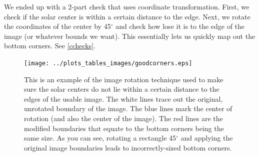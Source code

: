 \documentclass[10pt]{scrartcl}
\begin{document}
We ended up with a 2-part check that uses coordinate transformation. First, we check if the solar center is within a certain distance to the edge. Next, we rotate the coordinates of the center by 45$^\circ$ and check how lose it is to the edge of the image (or whatever bounds we want). This essentially lets us quickly map out the bottom corners. See \cref{cchecks}.

\begin{figure}[!ht]
\end{figure}

\begin{figure}[!ht]
  \texttt{[image: ../plots\_tables\_images/goodcorners.eps]}
  \caption{This is an example of the image rotation technique used to make sure the solar centers do not lie within a certain distance to the edges of the usable image. The white lines trace out the original, unrotated boundary of the image. The blue lines mark the center of rotation (and also the center of the image). The red lines are the modified boundaries that equate to the bottom corners being the same size. As you can see, rotating a rectangle 45$^\circ$ and applying the original image boundaries leads to incorrectly-sized bottom corners.}
  \label{goodcorner}
\end{figure}
\end{document}
